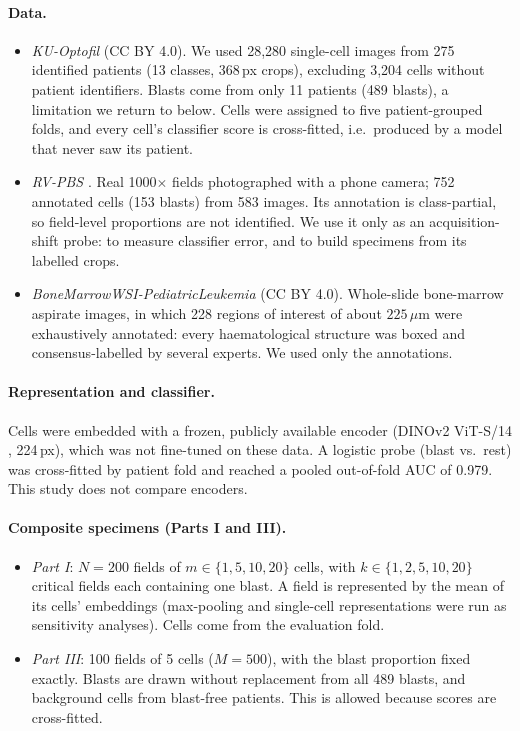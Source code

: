 \documentclass[11pt]{article}
\theoremstyle{remark}
\theoremstyle{definition}
\begin{document}
\paragraph{Data.}
\begin{itemize}
\item \emph{KU-Optofil} \cite{yarikan2026kuoptofil} (CC BY 4.0). We used 28,280 single-cell images from 275 identified patients (13 classes, 368\,px crops), excluding 3,204 cells without patient identifiers. Blasts come from only 11 patients (489 blasts), a limitation we return to below. Cells were assigned to five patient-grouped folds, and every cell's classifier score is cross-fitted, i.e.\ produced by a model that never saw its patient.
\item \emph{RV-PBS} \cite{rvpbs2024}. Real 1000$\times$ fields photographed with a phone camera; 752 annotated cells (153 blasts) from 583 images. Its annotation is class-partial, so field-level proportions are not identified. We use it only as an acquisition-shift probe: to measure classifier error, and to build specimens from its labelled crops.
\item \emph{BoneMarrowWSI-PediatricLeukemia} \cite{hofener2025bmwsi} (CC BY 4.0). Whole-slide bone-marrow aspirate images, in which 228 regions of interest of about $225\,\mu$m were exhaustively annotated: every haematological structure was boxed and consensus-labelled by several experts. We used only the annotations.
\end{itemize}

\paragraph{Representation and classifier.} Cells were embedded with a frozen, publicly available encoder (DINOv2 ViT-S/14 \cite{oquab2023dinov2}, 224\,px), which was not fine-tuned on these data. A logistic probe (blast vs.\ rest) was cross-fitted by patient fold and reached a pooled out-of-fold AUC of 0.979. This study does not compare encoders.

\paragraph{Composite specimens (Parts I and III).}
\begin{itemize}
\item \emph{Part I}: $N=200$ fields of $m\in\{1,5,10,20\}$ cells, with $k\in\{1,2,5,10,20\}$ critical fields each containing one blast. A field is represented by the mean of its cells' embeddings (max-pooling and single-cell representations were run as sensitivity analyses). Cells come from the evaluation fold.
\item \emph{Part III}: 100 fields of 5 cells ($M=500$), with the blast proportion fixed exactly. Blasts are drawn without replacement from all 489 blasts, and background cells from blast-free patients. This is allowed because scores are cross-fitted.
\end{itemize}
\end{document}
